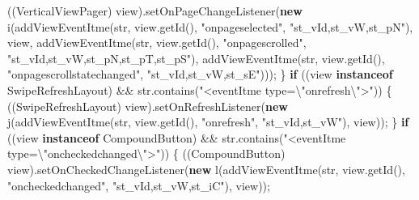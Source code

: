 \documentclass[
]{article}
\newenvironment{Shaded}{}{}
\newcommand{\ControlFlowTok}[1]{\textcolor[rgb]{0.00,0.44,0.13}{\textbf{#1}}}
\newcommand{\FunctionTok}[1]{\textcolor[rgb]{0.02,0.16,0.49}{#1}}
\newcommand{\KeywordTok}[1]{\textcolor[rgb]{0.00,0.44,0.13}{\textbf{#1}}}
\newcommand{\NormalTok}[1]{#1}
\newcommand{\OperatorTok}[1]{\textcolor[rgb]{0.40,0.40,0.40}{#1}}
\newcommand{\SpecialCharTok}[1]{\textcolor[rgb]{0.25,0.44,0.63}{#1}}
\newcommand{\StringTok}[1]{\textcolor[rgb]{0.25,0.44,0.63}{#1}}
\begin{document}
\begin{Shaded}
\begin{Highlighting}[]
            \OperatorTok{((}\NormalTok{VerticalViewPager}\OperatorTok{)}\NormalTok{ view}\OperatorTok{).}\FunctionTok{setOnPageChangeListener}\OperatorTok{(}\KeywordTok{new} \FunctionTok{i}\OperatorTok{(}\FunctionTok{addViewEventItme}\OperatorTok{(}\NormalTok{str}\OperatorTok{,}\NormalTok{ view}\OperatorTok{.}\FunctionTok{getId}\OperatorTok{(),} \StringTok{"onpageselected"}\OperatorTok{,} \StringTok{"st\_vId,st\_vW,st\_pN"}\OperatorTok{),}\NormalTok{ view}\OperatorTok{,} \FunctionTok{addViewEventItme}\OperatorTok{(}\NormalTok{str}\OperatorTok{,}\NormalTok{ view}\OperatorTok{.}\FunctionTok{getId}\OperatorTok{(),} \StringTok{"onpagescrolled"}\OperatorTok{,} \StringTok{"st\_vId,st\_vW,st\_pN,st\_pT,st\_pS"}\OperatorTok{),} \FunctionTok{addViewEventItme}\OperatorTok{(}\NormalTok{str}\OperatorTok{,}\NormalTok{ view}\OperatorTok{.}\FunctionTok{getId}\OperatorTok{(),} \StringTok{"onpagescrollstatechanged"}\OperatorTok{,} \StringTok{"st\_vId,st\_vW,st\_sE"}\OperatorTok{)));}
        \OperatorTok{\}}
        \ControlFlowTok{if} \OperatorTok{((}\NormalTok{view }\KeywordTok{instanceof}\NormalTok{ SwipeRefreshLayout}\OperatorTok{)} \OperatorTok{\&\&}\NormalTok{ str}\OperatorTok{.}\FunctionTok{contains}\OperatorTok{(}\StringTok{"\textless{}eventItme type=}\SpecialCharTok{\textbackslash{}"}\StringTok{onrefresh}\SpecialCharTok{\textbackslash{}"}\StringTok{\textgreater{}"}\OperatorTok{))} \OperatorTok{\{}
            \OperatorTok{((}\NormalTok{SwipeRefreshLayout}\OperatorTok{)}\NormalTok{ view}\OperatorTok{).}\FunctionTok{setOnRefreshListener}\OperatorTok{(}\KeywordTok{new} \FunctionTok{j}\OperatorTok{(}\FunctionTok{addViewEventItme}\OperatorTok{(}\NormalTok{str}\OperatorTok{,}\NormalTok{ view}\OperatorTok{.}\FunctionTok{getId}\OperatorTok{(),} \StringTok{"onrefresh"}\OperatorTok{,} \StringTok{"st\_vId,st\_vW"}\OperatorTok{),}\NormalTok{ view}\OperatorTok{));}
        \OperatorTok{\}}
        \ControlFlowTok{if} \OperatorTok{((}\NormalTok{view }\KeywordTok{instanceof}\NormalTok{ CompoundButton}\OperatorTok{)} \OperatorTok{\&\&}\NormalTok{ str}\OperatorTok{.}\FunctionTok{contains}\OperatorTok{(}\StringTok{"\textless{}eventItme type=}\SpecialCharTok{\textbackslash{}"}\StringTok{oncheckedchanged}\SpecialCharTok{\textbackslash{}"}\StringTok{\textgreater{}"}\OperatorTok{))} \OperatorTok{\{}
            \OperatorTok{((}\NormalTok{CompoundButton}\OperatorTok{)}\NormalTok{ view}\OperatorTok{).}\FunctionTok{setOnCheckedChangeListener}\OperatorTok{(}\KeywordTok{new} \FunctionTok{l}\OperatorTok{(}\FunctionTok{addViewEventItme}\OperatorTok{(}\NormalTok{str}\OperatorTok{,}\NormalTok{ view}\OperatorTok{.}\FunctionTok{getId}\OperatorTok{(),} \StringTok{"oncheckedchanged"}\OperatorTok{,} \StringTok{"st\_vId,st\_vW,st\_iC"}\OperatorTok{),}\NormalTok{ view}\OperatorTok{));}

\end{Highlighting}
\end{Shaded}
\end{document}
